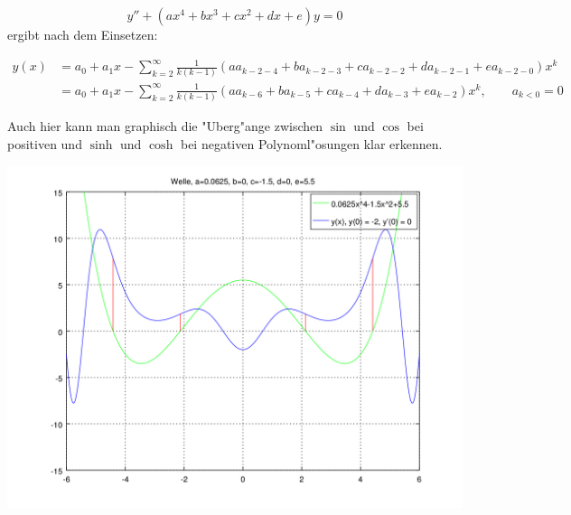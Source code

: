 \begin{equation*}
	y''+(ax^4+bx^3+cx^2+dx+e)y = 0
\end{equation*}
ergibt nach dem Einsetzen:

\begin{align*}
	y(x) &= a_0+a_1x-\sum_{k=2}^{\infty} \frac{1}{k(k-1)} (aa_{k-2-4} + 
	ba_{k-2-3} + ca_{k-2-2} + da_{k-2-1} +ea_{k-2-0})x^k
	\\
	&= a_0+a_1x-\sum_{k=2}^{\infty} \frac{1}{k(k-1)} (aa_{k-6} + ba_{k-5} + 
	ca_{k-4} + da_{k-3} +ea_{k-2})x^k, \qquad a_{k<0} = 0
\end{align*}

Auch hier kann man graphisch die "Uberg"ange zwischen $\sin$ und $\cos$ bei 
positiven und $\sinh$ und $\cosh$ bei negativen Polynoml"osungen klar erkennen.

\begin{center}
	\includegraphics[scale=0.55]{./wellen/images/allgemein/n4.png}
\end{center}